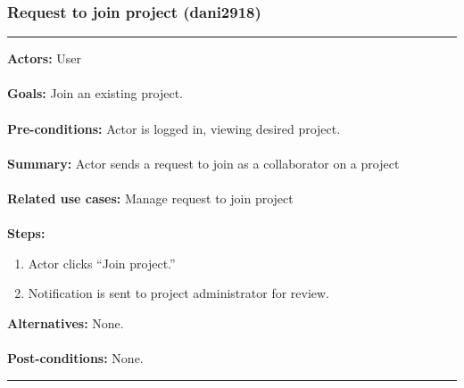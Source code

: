 \documentclass[11pt]{report}
\begin{document}
\subsubsection{Request to join project (dani2918)}
\vspace{2pt}
\hrule
\vspace{8pt}
 \textbf{Actors:} User \\ \\
\textbf{Goals:} Join an existing project. \\ \\
 \textbf{Pre-conditions:} Actor is logged in, viewing desired project.  \\ \\
\textbf{Summary:} Actor sends a request to join as a collaborator on a project\\ \\
\textbf{Related use cases:} Manage request to join project\\ \\
\textbf{Steps:} \begin{enumerate}
  \item Actor clicks ``Join project.'' 
  \item Notification is sent to project administrator for review. 
 \end{enumerate}
 \textbf{Alternatives:} None. \\ \\
 \textbf{Post-conditions:} None. \\
\vspace{8pt}
\hrule
\newpage
\end{document}
